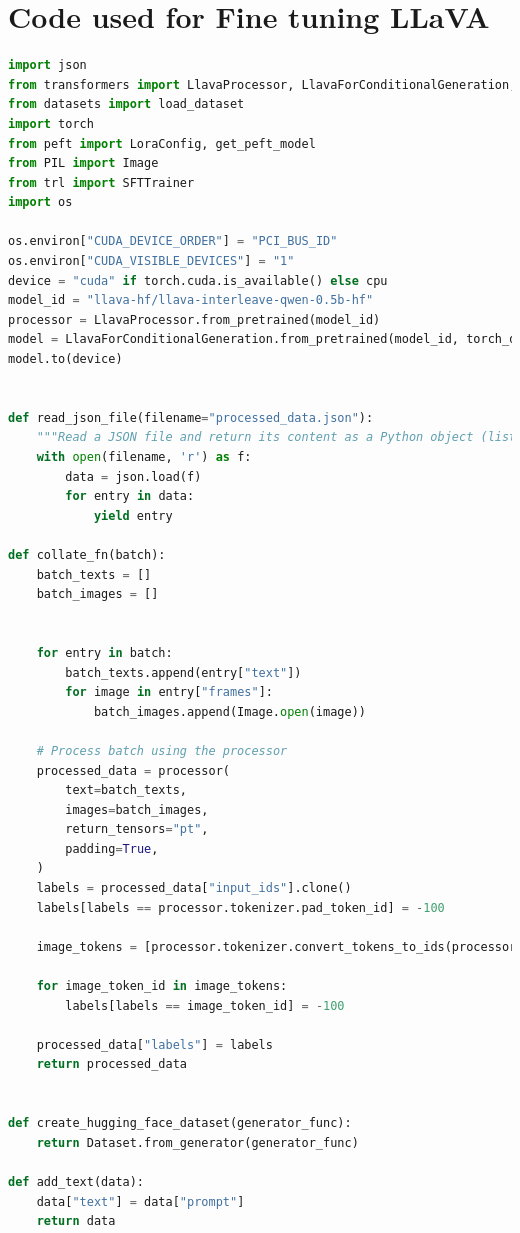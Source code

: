 \documentclass[12pt]{report}
\begin{document}
	\chapter{Code used for Fine tuning LLaVA}\label{app:finetuning}
	\begin{lstlisting}[language=Python,caption={LLaVA QLORA finetuning code}]
import json
from transformers import LlavaProcessor, LlavaForConditionalGeneration,TrainingArguments,EarlyStoppingCallback
from datasets import load_dataset
import torch
from peft import LoraConfig, get_peft_model
from PIL import Image
from trl import SFTTrainer
import os 

os.environ["CUDA_DEVICE_ORDER"] = "PCI_BUS_ID"
os.environ["CUDA_VISIBLE_DEVICES"] = "1"
device = "cuda" if torch.cuda.is_available() else cpu
model_id = "llava-hf/llava-interleave-qwen-0.5b-hf"
processor = LlavaProcessor.from_pretrained(model_id)
model = LlavaForConditionalGeneration.from_pretrained(model_id, torch_dtype=torch.float16,load_in_4bit=True)
model.to(device)


def read_json_file(filename="processed_data.json"):
    """Read a JSON file and return its content as a Python object (list/dict)."""
    with open(filename, 'r') as f:
        data = json.load(f)
        for entry in data:
            yield entry

def collate_fn(batch):
    batch_texts = []
    batch_images = []

        
    for entry in batch:
        batch_texts.append(entry["text"])
        for image in entry["frames"]:
            batch_images.append(Image.open(image))

    # Process batch using the processor
    processed_data = processor(
        text=batch_texts,
        images=batch_images,
        return_tensors="pt",
        padding=True,
    )
    labels = processed_data["input_ids"].clone()
    labels[labels == processor.tokenizer.pad_token_id] = -100

    image_tokens = [processor.tokenizer.convert_tokens_to_ids(processor.image_token)]
    
    for image_token_id in image_tokens:
        labels[labels == image_token_id] = -100

    processed_data["labels"] = labels
    return processed_data


def create_hugging_face_dataset(generator_func):
    return Dataset.from_generator(generator_func)

def add_text(data):
    data["text"] = data["prompt"]
    return data



\end{lstlisting}
\end{document}
